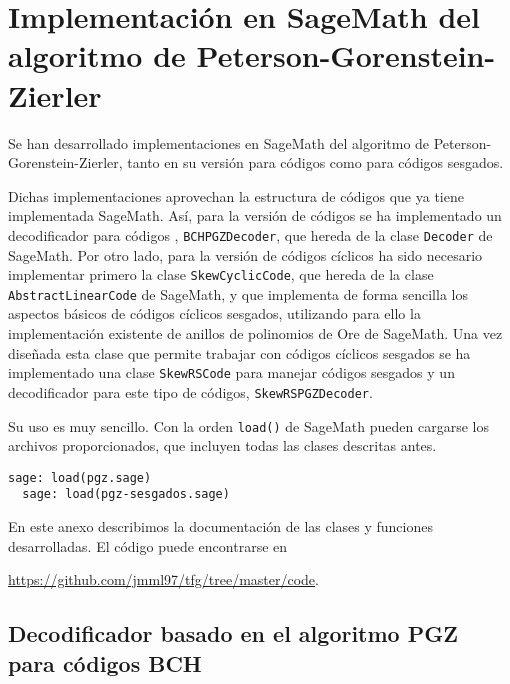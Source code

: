\chapter[Implementación en SageMath del algoritmo PGZ]{Implementación en SageMath del algoritmo de Peterson-Gorenstein-Zierler}
\label{annex:pgz-sage}

Se han desarrollado implementaciones en SageMath del algoritmo de Peterson-Gorenstein-Zierler, tanto en su versión para códigos  como para códigos  sesgados.

Dichas implementaciones aprovechan la estructura de códigos que ya tiene implementada SageMath.
Así, para la versión de códigos  se ha implementado un decodificador para códigos , \texttt{BCHPGZDecoder}, que hereda de la clase \texttt{Decoder} de SageMath.
Por otro lado, para la versión de códigos cíclicos ha sido necesario implementar primero la clase \texttt{SkewCyclicCode}, que hereda de la clase \texttt{AbstractLinearCode} de SageMath, y que implementa de forma sencilla los aspectos básicos de códigos cíclicos sesgados, utilizando para ello la implementación existente de anillos de polinomios de Ore de SageMath.
Una vez diseñada esta clase que permite trabajar con códigos cíclicos sesgados se ha implementado una clase \texttt{SkewRSCode} para manejar códigos  sesgados y un decodificador para este tipo de códigos, \texttt{SkewRSPGZDecoder}.

Su uso es muy sencillo.
Con la orden \texttt{load()} de SageMath pueden cargarse los archivos proporcionados, que incluyen todas las clases descritas antes.

\begin{lstlisting}[gobble=2]
  sage: load(pgz.sage)
  sage: load(pgz-sesgados.sage)
\end{lstlisting}

En este anexo describimos la documentación de las clases y funciones desarrolladas.
El código puede encontrarse en
\begin{center}
  \url{https://github.com/jmml97/tfg/tree/master/code}.
\end{center}

\section{Decodificador basado en el algoritmo PGZ para códigos BCH}

